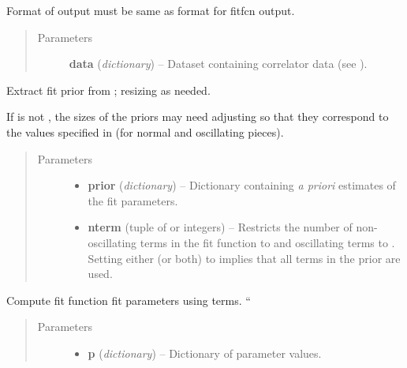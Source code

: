 \documentclass[letterpaper,10pt,english]{sphinxmanual}
\begin{document}
\begin{fulllineitems}
\begin{fulllineitems}
Format of output must be same as format for fitfcn output.
\begin{quote}\begin{description}
\item[{Parameters}] \leavevmode
\textbf{data} (\emph{dictionary}) -- Dataset containing correlator data 
(see ).

\end{description}\end{quote}

\end{fulllineitems}


\begin{fulllineitems}
\label{corrfitter:corrfitter.BaseModel.buildprior}
Extract fit prior from ; resizing as needed.

If  is not , the sizes of the priors may need
adjusting so that they correspond to the values specified in 
 (for normal and oscillating pieces).
\begin{quote}\begin{description}
\item[{Parameters}] \leavevmode\begin{itemize}
\item {} 
\textbf{prior} (\emph{dictionary}) -- Dictionary containing \emph{a priori} estimates of the 
fit parameters.

\item {} 
\textbf{nterm} (tuple of  or integers) -- Restricts the number of non-oscillating terms in the
fit function to  and oscillating terms to
. Setting either (or both) to  implies that
all terms in the prior are used.

\end{itemize}

\end{description}\end{quote}

\end{fulllineitems}


\begin{fulllineitems}
\label{corrfitter:corrfitter.BaseModel.fitfcn}
Compute fit function fit parameters  using  terms. ``
\begin{quote}\begin{description}
\item[{Parameters}] \leavevmode\begin{itemize}
\item {} 
\textbf{p} (\emph{dictionary}) -- Dictionary of parameter values.


\end{itemize}
\end{description}
\end{quote}
\end{fulllineitems}
\end{fulllineitems}
\end{document}
